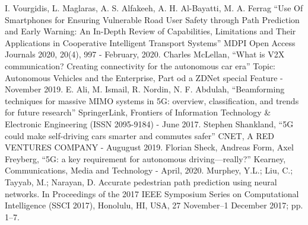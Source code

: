 \documentclass[conference]{IEEEtran}
\begin{document}
\begin{thebibliography}{00}
     I. Vourgidis, L. Maglaras, A. S. Alfakeeh, A. H. Al-Bayatti, M. A. Ferrag ``Use Of Smartphones for Ensuring Vulnerable Road User Safety through Path Prediction and Early Warning: An In-Depth Review of Capabilities, Limitations and Their Applications in Cooperative Intelligent Transport Systems'' MDPI Open Access Journals 2020, 20(4), 997 - February, 2020.
     Charles McLellan, ``What is V2X communication? Creating connectivity for the autonomous car era'' Topic: Autonomous Vehicles and the Enterprise, Part od a ZDNet special Feature - November 2019.
     E. Ali, M. Ismail, R. Nordin, N. F. Abdulah, ``Beamforming techniques for massive MIMO systems in 5G: overview, classification, and trends for future research'' SpringerLink, Frontiers of Information Technology \& Electronic Engineering  (ISSN 2095-9184) - June 2017.
     Stephen Shankland, ``5G could make self-driving cars smarter and commutes safer'' CNET, A RED VENTURES COMPANY - Augugust 2019.
     Florian Sheck, Andreas Form, Axel Freyberg, ``5G: a key requirement for autonomous driving—really?'' Kearney, Communications, Media and Technology - April, 2020.
     Murphey, Y.L.; Liu, C.; Tayyab, M.; Narayan, D. Accurate pedestrian path prediction using neural networks. In Proceedings of the 2017 IEEE Symposium Series on Computational Intelligence (SSCI 2017), Honolulu, HI, USA, 27 November–1 December 2017; pp. 1–7.
\end{thebibliography}
\vspace{12pt}
\end{document}
